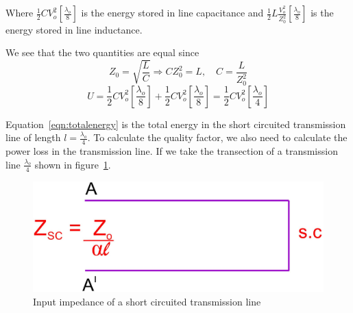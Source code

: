 Where $\frac{1}{2}CV_{o}^{2}\left[\frac{\lambda_{o}}{8}\right] $ is the energy stored in line capacitance and $ \frac{1}{2}L\frac{V_{o}^{2}}{Z_0^{2}}\left[ \frac{\lambda_{o}}{8} \right] $ is the energy stored in line inductance.

We see that the two quantities are equal since
\begin{equation*}
Z_0 = \sqrt{\frac{L}{C}}\Longrightarrow CZ_0^{2} = L,\quad C = \frac{L}{Z_0^{2}}
\end{equation*}
\begin{dmath}
U = \frac{1}{2}CV_{o}^{2}\left[\frac{\lambda_{o}}{8}\right] +\frac{1}{2}CV_{o}^{2}\left[\frac{\lambda_{o}}{8}\right]
= \frac{1}{2}CV_{o}^{2}\left[\frac{\lambda_{o}}{4}\right]
\label{eqn:totalenergy}
\end{dmath}

Equation~\eqref{eqn:totalenergy} is the total energy in the short circuited transmission line of length $l = \frac{\lambda_o}{4}$. To calculate the quality factor, we also need to calculate the power loss in the transmission line. If we take the transection of a transmission line $\frac{\lambda_{o}}{4}$ shown in figure~\ref{fig:fig4}.
\begin{figure}[h]
\centering
\includegraphics[width=1\linewidth]{./graphics/fig4}
\caption{Input impedance of a short circuited transmission line}
\label{fig:fig4}
\end{figure}

